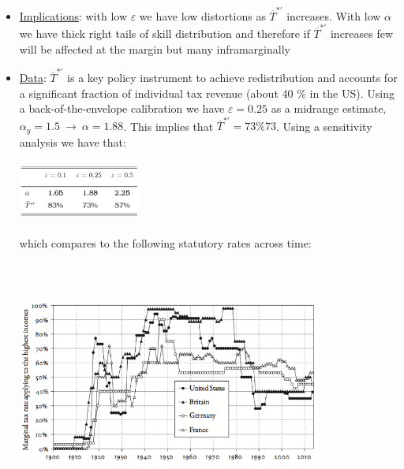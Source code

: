 \documentclass{article}
\begin{document}
\begin{itemize}
    \item   \underline{Implications}: with low $\varepsilon$ we have low distortions as $\overline{T}^{*'}$ increases. With low $\alpha$ we have thick right tails of skill distribution and therefore if $\overline{T}^{*'}$ increases few will be affected at the margin but many inframarginally
    \item  \underline{Data}: $\overline{T}^{*'}$ is a key policy instrument to achieve redistribution and accounts for a significant fraction of individual tax revenue (about 40 $\%$ in the US). Using a back-of-the-envelope calibration we have $\varepsilon = 0.25$ as a midrange estimate, $\alpha_{y} = 1.5 \ \rightarrow \ \alpha = 1.88$. This implies that $\overline{T}^{*'} = 73 \% 73$.
    \newline
    Using a sensitivity analysis we have that:
    \newline
    \begin{center}
    \includegraphics[width=4cm, height=2cm]{pic22}
    \end{center}
    which compares to the following statutory rates across time:
    \newline
    \begin{center}
    \includegraphics[width=10cm, height=8cm]{pic23}
    \end{center}
\end{itemize}

\newpage
\end{document}
